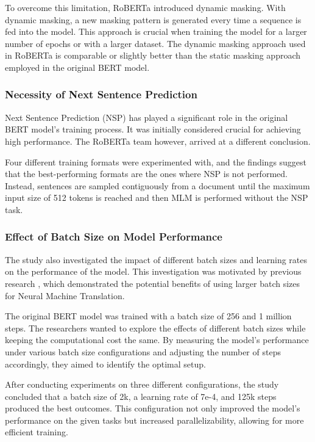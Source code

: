 \documentclass[12pt,oneside,bibtotoc,liststotoc]{scrbook}
\begin{document}
To overcome this limitation, RoBERTa introduced dynamic masking. With dynamic masking, a new masking pattern is generated every time a sequence is fed into the model. This approach is crucial when training the model for a larger number of epochs or with a larger dataset. The dynamic masking approach used in RoBERTa is comparable or slightly better than the static masking approach employed in the original BERT model. \cite{roberta}

\subsubsection{Necessity of Next Sentence Prediction}
Next Sentence Prediction (NSP) has played a significant role in the original BERT model's training process. It was initially considered crucial for achieving high performance. The RoBERTa team however, arrived at a different conclusion.

Four different training formats were experimented with, and the findings suggest that the best-performing formats are the ones where NSP is not performed. Instead, sentences are sampled contiguously from a document until the maximum input size of 512 tokens is reached and then MLM is performed without the NSP task. \cite{roberta}

\subsubsection{Effect of Batch Size on Model Performance}
The study also investigated the impact of different batch sizes and learning rates on the performance of the model. This investigation was motivated by previous research \cite{OttScaling}, which demonstrated the potential benefits of using larger batch sizes for Neural Machine Translation.

The original BERT model was trained with a batch size of 256 and 1 million steps. The researchers wanted to explore the effects of different batch sizes while keeping the computational cost the same. By measuring the model's performance under various batch size configurations and adjusting the number of steps accordingly, they aimed to identify the optimal setup.

After conducting experiments on three different configurations, the study concluded that a batch size of 2k, a learning rate of 7e-4, and 125k steps produced the best outcomes. This configuration not only improved the model's performance on the given tasks but increased parallelizability, allowing for more efficient training. \cite{roberta}
\end{document}
